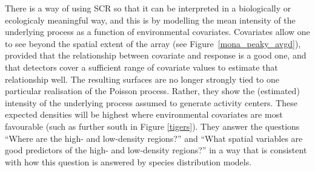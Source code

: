 \documentclass[useAMS,usenatbib,referee]{biom}
\begin{document}

There is a way of using SCR so that it can be interpreted in a biologically or ecologicaly meaningful way, and this is by modelling the mean intensity of the underlying process as a function of environmental covariates. Covariates allow one to see beyond the spatial extent of the array (see Figure~\ref{mona_peaky_avgd}), provided that the relationship between covariate and response is a good one, and that detectors cover a sufficient range of covariate values to estimate that relationship well. The resulting surfaces are no longer strongly tied to one particular realisation of the Poisson process. Rather, they show the (estimated) intensity of the underlying process assumed to generate activity centers. These expected densities will be highest where environmental covariates are most favourable (such as further south in Figure \ref{tigers}). They answer the questions ``Where are the high- and low-density regions?'' and ``What spatial variables are good predictors of the high- and low-density regions?'' in a way that is consistent with how this question is answered by species distribution models. %
\end{document}
